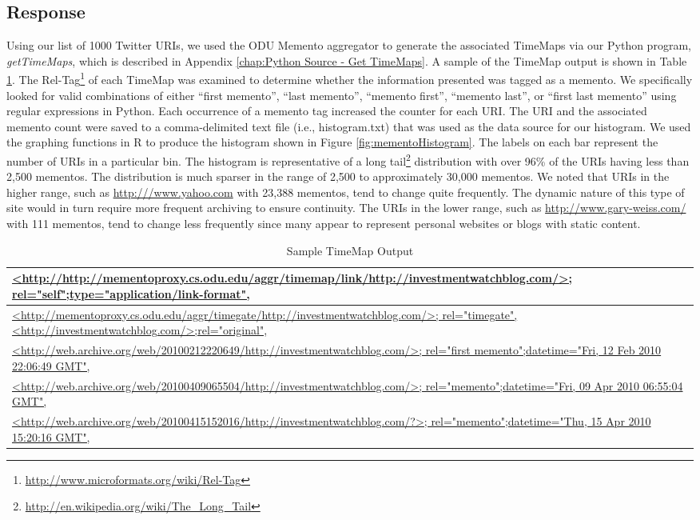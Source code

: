 \documentclass[letterpaper,11pt]{report}
\begin{document}
\begin{savenotes}
\subsection{Response}Using our list of 1000 Twitter URIs, we used the ODU Memento aggregator to generate the associated TimeMaps via our Python program, \emph{getTimeMaps}, which is described in Appendix \ref{chap:Python Source - Get TimeMaps}. A sample of the TimeMap output is shown in Table \ref{tab:SampleTimeMapOutput}. The Rel-Tag\footnote{\url{http://www.microformats.org/wiki/Rel-Tag}} of each TimeMap was examined to determine whether the information presented was tagged as a memento.  We specifically looked for valid combinations of either ``first memento'', ``last memento'', ``memento first'', ``memento last'', or ``first last memento'' using regular expressions in Python. Each occurrence of a memento tag increased the counter for each URI. The URI and the associated memento count were saved to a comma-delimited text file (i.e., histogram.txt) that was used as the data source for our histogram. We used the graphing functions in R to produce the histogram shown in Figure \ref{fig:mementoHistogram}. The labels on each bar represent the number of URIs in a particular bin. The histogram is representative of a long tail\footnote{\url{http://en.wikipedia.org/wiki/The_Long_Tail}} distribution with over 96\% of the URIs having less than 2,500 mementos. The distribution is much sparser in the range of 2,500 to approximately 30,000 mementos. We noted that URIs in the higher range, such as \url{http:///www.yahoo.com} with 23,388 mementos, tend to change quite frequently. The dynamic nature of this type of site would in turn require more frequent archiving to ensure continuity. The URIs in the lower range, such as \url{http://www.gary-weiss.com/} with 111 mementos, tend to change less frequently since many appear to represent personal websites or blogs with static content.

\begin{table}[htbp]
\centering
    \begin{tabularx}{\textwidth}{X}
		\hline
\url{<http://http://mementoproxy.cs.odu.edu/aggr/timemap/link/http://investmentwatchblog.com/>; rel="self";type="application/link-format", }\\ \hline
 \url{<http://mementoproxy.cs.odu.edu/aggr/timegate/http://investmentwatchblog.com/>; rel="timegate",<http://investmentwatchblog.com/>;rel="original",} \\ \hline
 \url{<http://web.archive.org/web/20100212220649/http://investmentwatchblog.com/>; rel="first memento";datetime="Fri, 12 Feb 2010 22:06:49 GMT",}  \\ \hline
 \url{<http://web.archive.org/web/20100409065504/http://investmentwatchblog.com/>; rel="memento";datetime="Fri, 09 Apr 2010 06:55:04 GMT",}  \\ \hline
 \url{<http://web.archive.org/web/20100415152016/http://investmentwatchblog.com/?>; rel="memento";datetime="Thu, 15 Apr 2010 15:20:16 GMT",} \\ \hline
    \end{tabularx}
		\caption{Sample TimeMap Output}
		\label{tab:SampleTimeMapOutput}
\end{table}


\end{savenotes}
\end{document}
